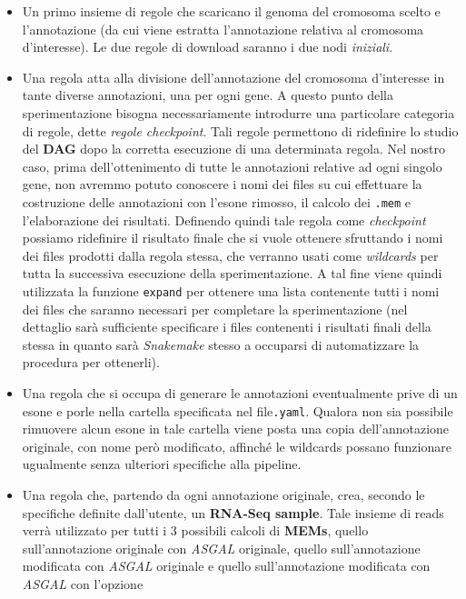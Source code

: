 \documentclass[a4paper,12pt, oneside]{book}
\begin{document}
\begin{itemize}
  \item Un primo insieme di regole che scaricano il genoma del cromosoma scelto
  e l'annotazione (da cui viene estratta l'annotazione relativa al cromosoma
  d'interesse). Le due regole di download saranno i due nodi \textit{iniziali}. 
  \item Una regola atta alla divisione dell'annotazione del cromosoma
  d'interesse in tante diverse annotazioni, una per ogni gene. A questo punto
  della 
  sperimentazione bisogna necessariamente introdurre una particolare categoria
  di regole, dette \textit{regole checkpoint}. Tali regole permettono di
  ridefinire lo studio del \textbf{DAG} dopo la corretta esecuzione di una
  determinata regola. Nel nostro caso, prima dell'ottenimento di tutte le
  annotazioni relative ad ogni singolo gene, non avremmo potuto conoscere i nomi
  dei files su cui effettuare la costruzione delle annotazioni con 
  l'esone rimosso, il calcolo dei \texttt{.mem} e l'elaborazione dei
  risultati. Definendo quindi tale regola come \textit{checkpoint} possiamo
  ridefinire il risultato finale che si vuole ottenere sfruttando i nomi dei
  files prodotti dalla regola stessa, che verranno usati come \textit{wildcards}
  per tutta la successiva esecuzione della sperimentazione. A tal fine viene
  quindi utilizzata la funzione \texttt{expand} per ottenere una lista
  contenente tutti i nomi dei files che saranno necessari per completare la
  sperimentazione (nel dettaglio sarà sufficiente specificare i files contenenti
  i risultati finali della stessa in quanto sarà \textit{Snakemake} stesso a
  occuparsi di automatizzare la procedura per ottenerli).
  \item Una regola che si occupa di generare le annotazioni eventualmente prive
  di un esone e porle nella cartella specificata nel file\texttt{.yaml}. Qualora
  non sia possibile rimuovere alcun esone in tale cartella viene posta una copia
  dell'annotazione originale, con nome però modificato, affinché le wildcards
  possano funzionare ugualmente senza ulteriori specifiche alla pipeline. 
  \item Una regola che, partendo da ogni annotazione originale, crea, secondo le
  specifiche definite dall'utente, un \textbf{RNA-Seq sample}. Tale insieme di
  reads verrà utilizzato per tutti i 3 possibili calcoli di \textbf{MEMs},
  quello sull'annotazione originale con \textit{ASGAL} originale, quello
  sull'annotazione modificata con \textit{ASGAL} originale e 
  quello sull'annotazione modificata con \textit{ASGAL} con l'opzione

\end{itemize}
\end{document}
